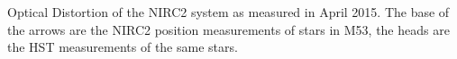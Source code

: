 Optical Distortion of the NIRC2 system as measured in April 2015.  The base of the arrows are the NIRC2 position measurements of stars in M53, the heads are the HST measurements of the same stars. \label{quiver_apr} 